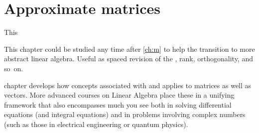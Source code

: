 
\chapter{Approximate matrices}
\label{ch:am}

\minitoc



This
\begin{aside}
This chapter could be studied any time after \autoref{ch:m} to help the transition to more abstract linear algebra.  
Useful as spaced revision of the \svd, rank, orthogonality, and so~on.
\end{aside}%
chapter develops how concepts associated with  and  applies to matrices as well as vectors.  
More advanced courses on Linear Algebra place these in a unifying framework that also encompasses much you see both in solving differential equations (and integral equations) and in problems involving complex numbers (such as those in electrical engineering or quantum physics). 



\begin{comment} 
Huge applications of \svd{}s to video compression, experimental errors, and other areas.
Introduce digital \idx{image compression} by \svd{}s \pooliv{p.607--8} \holti{p.336--7}  \cite[\S07]{Davis99a}.
\cite{Higham86} mentions applications of \idx{polar decomposition} to the Orthogonal Procrustes problem.
\end{comment}







\endinput

